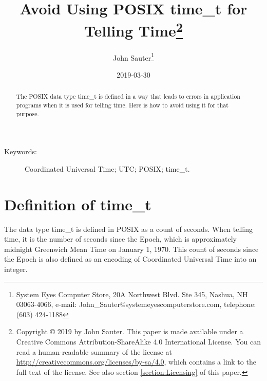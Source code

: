 \documentclass[letterpaper,twoside]{article}
\begin{document}
\title{Avoid Using POSIX {\ttfamily time\_t} for Telling
  Time\footnote{Copyright
    {\copyright} 2019 by John Sauter.
    This paper is made available under a
    Creative Commons Attribution-ShareAlike 4.0 International License.
    You can read a human-readable summary of the license at
    \url{http://creativecommons.org/licenses/by-sa/4.0}, which contains
    a link to the full text of the license.
    See also section \ref{section:Licensing} of this paper.}
}
\author{John Sauter\footnote{
    System Eyes Computer Store,
    20A Northwest Blvd.  Ste 345,
    Nashua, NH  03063-4066,
    e-mail: John\_Sauter@systemeyescomputerstore.com,
    telephone: (603) 424-1188}}
\date{2019-03-30}
\maketitle
\begin{abstract}
  The POSIX data type {\ttfamily time\_t} is defined in a way that leads
  to errors in application programs when it is used for telling time.
  Here is how to avoid using it for that purpose.
\end{abstract}
\begin{description}
\item[Keywords:]Coordinated Universal Time; UTC; POSIX; time\_t.
\end{description}
  
\newpage

\section{Definition of {\ttfamily time\_t}}
The data type {\ttfamily time\_t} is defined in POSIX\citep{7582338}
as a count of seconds.
When telling time, it is the number of seconds
since the Epoch, which is approximately midnight Greenwich Mean Time on
January 1, 1970.  This count of seconds since the Epoch is also
defined as an encoding of Coordinated Universal Time into an integer.
\end{document}
